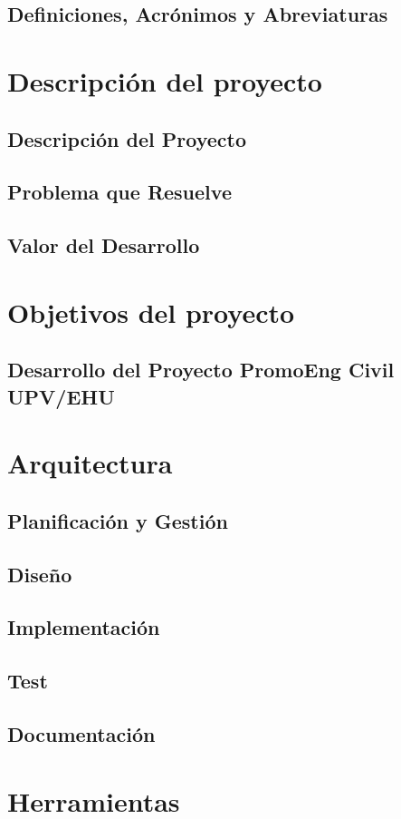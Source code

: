 \documentclass{report}
\begin{document}
        \section{Definiciones, Acrónimos y Abreviaturas}
    \chapter{Descripción del proyecto}
        \section{Descripción del Proyecto}
        \section{Problema que Resuelve}
        \section{Valor del Desarrollo}
    \chapter{Objetivos del proyecto}
        \section{Desarrollo del Proyecto PromoEng Civil UPV/EHU}
    \chapter{Arquitectura}
        \section{Planificación y Gestión}
        \section{Diseño}
        \section{Implementación}
        \section{Test}
        \section{Documentación}
    \chapter{Herramientas}
\end{document}
